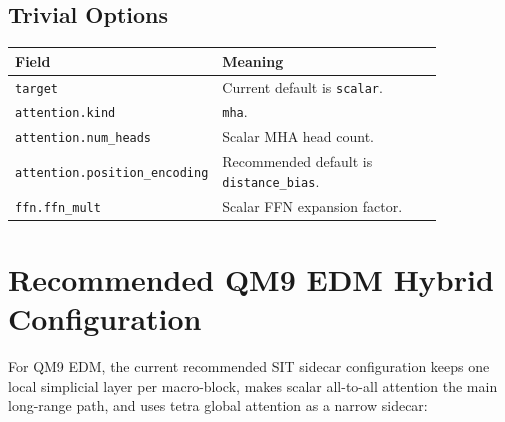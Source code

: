 \documentclass[11pt]{article}
\begin{document}
\subsection{Trivial Options}

\begin{center}
\begin{tabular}{p{0.29\linewidth}p{0.56\linewidth}}
\toprule
Field & Meaning \\
\midrule
\texttt{target} & Current default is \texttt{scalar}. \\
\texttt{attention.kind} & \texttt{mha}. \\
\texttt{attention.num\_heads} & Scalar MHA head count. \\
\texttt{attention.position\_encoding} & Recommended default is \texttt{distance\_bias}. \\
\texttt{ffn.ffn\_mult} & Scalar FFN expansion factor. \\
\bottomrule
\end{tabular}
\end{center}

\section{Recommended QM9 EDM Hybrid Configuration}

For QM9 EDM, the current recommended SIT sidecar configuration keeps one local
simplicial layer per macro-block, makes scalar all-to-all attention the main
long-range path, and uses tetra global attention as a narrow sidecar:
\end{document}
